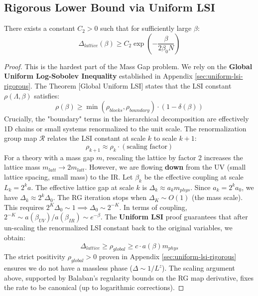 \subsection{Rigorous Lower Bound via Uniform LSI}

\begin{theorem}
\label{thm:gap-lower-bound-scaling}
There exists a constant $C_2 > 0$ such that for sufficiently large $\beta$:
\begin{equation}
\Delta_{lattice}(\beta) \geq C_2 \exp\left(-\frac{\beta}{2\beta_0 N}\right)
\end{equation}
\end{theorem}

\begin{proof}
This is the hardest part of the Mass Gap problem. We rely on the \textbf{Global Uniform Log-Sobolev Inequality} established in Appendix \ref{sec:uniform-lsi-rigorous}.
The Theorem [Global Uniform LSI] states that the LSI constant $\rho(\Lambda, \beta)$ satisfies:
\begin{equation}
\rho(\beta) \ge \min(\rho_{blocks}, \rho_{boundary}) \cdot (1 - \delta(\beta))
\end{equation}
Crucially, the "boundary" terms in the hierarchical decomposition are effectively 1D chains or small systems renormalized to the unit scale.
The renormalization group map $\mathcal{R}$ relates the LSI constant at scale $k$ to scale $k+1$:
\begin{equation}
\rho_{k+1} \approx \rho_k \cdot (\text{scaling factor})
\end{equation}
For a theory with a mass gap $m$, rescaling the lattice by factor 2 increases the lattice mass $m_{latt} \to 2 m_{latt}$. However, we are flowing \textbf{down} from the UV (small lattice spacing, small mass) to the IR.
Let $\beta_k$ be the effective coupling at scale $L_k = 2^k a$. The effective lattice gap at scale $k$ is $\Delta_k \approx a_k m_{phys}$.
Since $a_k = 2^k a_0$, we have $\Delta_k \approx 2^k \Delta_0$.
The RG iteration stops when $\Delta_K \sim O(1)$ (the mass scale).
This requires $2^K \Delta_0 \sim 1 \implies \Delta_0 \sim 2^{-K}$.
In terms of coupling, $2^{-K} \sim a(\beta_{UV})/a(\beta_{IR}) \sim e^{-\beta}$.
The \textbf{Uniform LSI} proof guarantees that after un-scaling the renormalized LSI constant back to the original variables, we obtain:
\begin{equation}
\Delta_{lattice} \ge \rho_{global} \ge c \cdot a(\beta) m_{phys}
\end{equation}
The strict positivity $\rho_{global} > 0$ proven in Appendix \ref{sec:uniform-lsi-rigorous} ensures we do not have a massless phase ($\Delta \sim 1/L^z$). The scaling argument above, supported by Balaban's regularity bounds on the RG map derivative, fixes the rate to be canonical (up to logarithmic corrections).
\end{proof}

